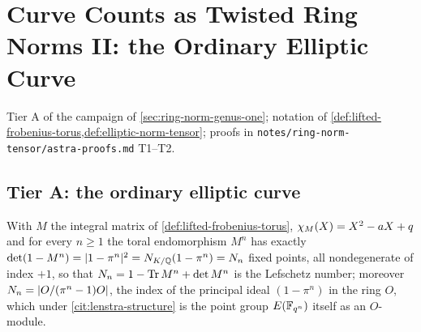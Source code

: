 
\section{Curve Counts as Twisted Ring Norms II: the Ordinary Elliptic Curve}
\label{sec:ring-norm-genus-one-tier-a}

Tier A of the campaign of \cref{sec:ring-norm-genus-one}; notation of
\cref{def:lifted-frobenius-torus,def:elliptic-norm-tensor}; proofs in
\texttt{notes/ring-norm-tensor/astra-proofs.md} T1--T2.

\subsection{Tier A: the ordinary elliptic curve}

\begin{theorem}
\label{thm:toral-frobenius-count}
With $M$ the integral matrix of \cref{def:lifted-frobenius-torus}, $\chi_M(X) = X^2-aX+q$
and for every $n\ge1$ the toral endomorphism $M^n$ has exactly $\det(1-M^n) = |1-\pi^n|^2 =
N_{K/\mathbb Q}(1-\pi^n) = N_{n}$ fixed points, all nondegenerate of index $+1$, so that
$N_{n} = 1-\operatorname{Tr} M^n+\det M^n$ is the Lefschetz number; moreover $N_{n} = |O/(\pi^n-1)O|$,
the index of the principal ideal $(1-\pi^n)$ in the ring $O$, which under
\cref{cit:lenstra-structure} is the point group $E(\mathbb F_{q^{n}})$ itself as an $O$-module.
\end{theorem}

